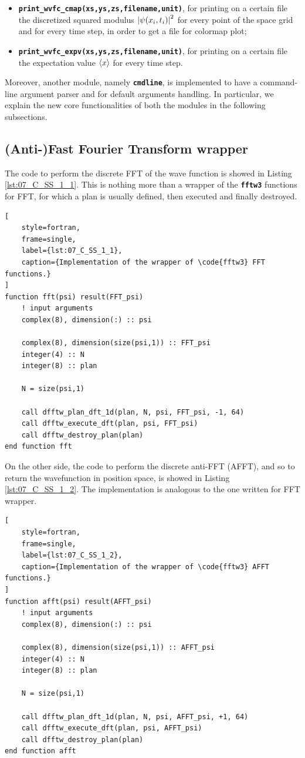 \documentclass[pra, onecolumn, notitlepage, floats, 11pt]{revtex4-1}
\newcommand{\codebold}[2][cobalt]{\texttt{\bfseries {\color{#1}#2}}}
\newcommand{\code}[2][black]{\color{#1}\texttt{#2}}
\newcommand{\codefunctionbold}[2]{\texttt{\bfseries {\color{cobalt}#1}({\color{lava}#2})}}
\begin{document}
\begin{itemize}
    \item \codefunctionbold{print\_wvfc\_cmap}{xs,ys,zs,filename,unit}, for printing on a certain file the discretized squared modulus \( \abs{\psi(x_{i},t_{i})}^2 \) for every point of the space grid and for every time step, in order to get a file for colormap plot;
    \item \codefunctionbold{print\_wvfc\_expv}{xs,ys,zs,filename,unit}, for printing on a certain file the expectation value \( \expval{x} \) for every time step.
\end{itemize}

Moreover, another module, namely \codebold{cmdline}, is implemented to have a command-line argument parser and for default arguments handling. In particular, we explain the new core functionalities of both the modules in the following subsections.



\subsection{(Anti-)Fast Fourier Transform wrapper}
The code to perform the discrete FFT of the wave function is showed in Listing \ref{lst:07_C_SS_1_1}. This is nothing more than a wrapper of the \codebold[black]{fftw3} functions for FFT, for which a plan is usually defined, then executed and finally destroyed.

\begin{lstlisting}[
    style=fortran,
    frame=single,
    label={lst:07_C_SS_1_1},
    caption={Implementation of the wrapper of \code{fftw3} FFT functions.}
]
function fft(psi) result(FFT_psi)
    ! input arguments
    complex(8), dimension(:) :: psi

    complex(8), dimension(size(psi,1)) :: FFT_psi
    integer(4) :: N
    integer(8) :: plan

    N = size(psi,1)

    call dfftw_plan_dft_1d(plan, N, psi, FFT_psi, -1, 64)
    call dfftw_execute_dft(plan, psi, FFT_psi)
    call dfftw_destroy_plan(plan)
end function fft
\end{lstlisting}

On the other side, the code to perform the discrete anti-FFT (AFFT), and so to return the wavefunction in position space, is showed in Listing \ref{lst:07_C_SS_1_2}. The implementation is analogous to the one written for FFT wrapper.

\begin{lstlisting}[
    style=fortran,
    frame=single,
    label={lst:07_C_SS_1_2},
    caption={Implementation of the wrapper of \code{fftw3} AFFT functions.}
]
function afft(psi) result(AFFT_psi)
    ! input arguments
    complex(8), dimension(:) :: psi

    complex(8), dimension(size(psi,1)) :: AFFT_psi
    integer(4) :: N
    integer(8) :: plan

    N = size(psi,1)

    call dfftw_plan_dft_1d(plan, N, psi, AFFT_psi, +1, 64)
    call dfftw_execute_dft(plan, psi, AFFT_psi)
    call dfftw_destroy_plan(plan)
end function afft
\end{lstlisting}
\end{document}
